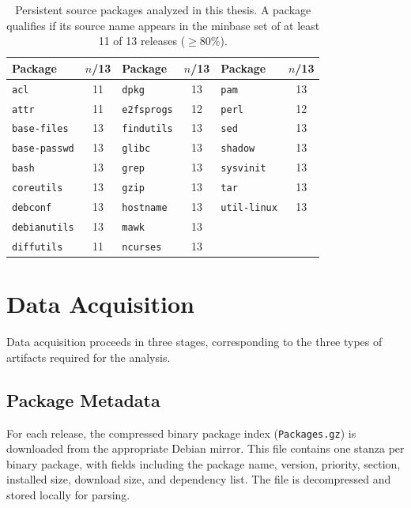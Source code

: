 \begin{table}[ht]
  \centering
  \caption[Persistent source packages analyzed in this thesis.]{Persistent source packages analyzed in this thesis. A package qualifies if its source name appears in the minbase set of at least 11 of 13 releases ($\geq 80\%$).}
  \label{tab:persistent-packages}
  \begin{tabular}{lc@{\qquad}lc@{\qquad}lc}
    \hline
    Package & $n$/13 & Package & $n$/13 & Package & $n$/13 \\
    \hline
    \texttt{acl}          & 11 & \texttt{dpkg}       & 13 & \texttt{pam}        & 13 \\
    \texttt{attr}         & 11 & \texttt{e2fsprogs}  & 12 & \texttt{perl}       & 12 \\
    \texttt{base-files}   & 13 & \texttt{findutils}  & 13 & \texttt{sed}        & 13 \\
    \texttt{base-passwd}  & 13 & \texttt{glibc}      & 13 & \texttt{shadow}     & 13 \\
    \texttt{bash}         & 13 & \texttt{grep}       & 13 & \texttt{sysvinit}   & 13 \\
    \texttt{coreutils}    & 13 & \texttt{gzip}       & 13 & \texttt{tar}        & 13 \\
    \texttt{debconf}      & 13 & \texttt{hostname}   & 13 & \texttt{util-linux} & 13 \\
    \texttt{debianutils}  & 13 & \texttt{mawk}       & 13 &                     &    \\
    \texttt{diffutils}    & 11 & \texttt{ncurses}    & 13 &                     &    \\
    \hline
  \end{tabular}
\end{table}

\section{Data Acquisition}
\label{sec:acquisition}

Data acquisition proceeds in three stages, corresponding to the three types of artifacts required for the analysis.

\subsection*{Package Metadata}
For each release, the compressed binary package index (\texttt{Packages.gz}) is downloaded from the appropriate Debian mirror. This file contains one stanza per binary package, with fields including the package name, version, priority, section, installed size, download size, and dependency list. The file is decompressed and stored locally for parsing.

